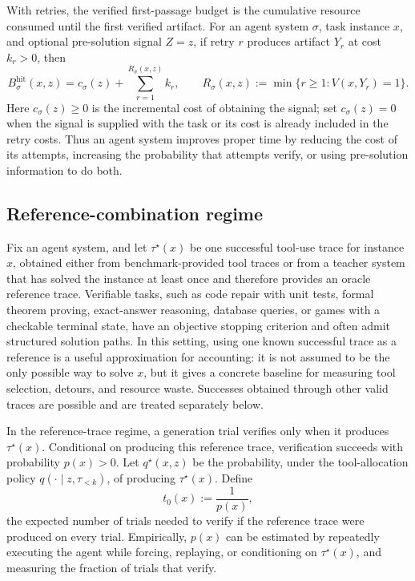 With retries, the verified first-passage budget is the cumulative resource
consumed until the first verified artifact.  For an agent system \(\sigma\), task
instance \(x\), and optional pre-solution signal \(Z=z\), if retry \(r\) produces
artifact \(Y_r\) at cost \(k_r>0\), then
\[
B_\sigma^{\mathrm{hit}}(x,z)
=
c_\sigma(z)+\sum_{r=1}^{R_\sigma(x,z)} k_r,
\qquad
R_\sigma(x,z):=\min\{r\ge1:V(x,Y_r)=1\}.
\]
Here \(c_\sigma(z)\ge0\) is the incremental cost of obtaining the signal; set
\(c_\sigma(z)=0\) when the signal is supplied with the task or its cost is
already included in the retry costs.  Thus an agent system improves proper time
by reducing the cost of its attempts, increasing the probability that attempts
verify, or using pre-solution information to do both.

\subsection{Reference-combination regime}

Fix an agent
system, and let \(\tau^\star(x)\) be one successful tool-use trace for instance
\(x\), obtained either from benchmark-provided tool traces or from a teacher
system that has solved the instance at least once and therefore provides an
oracle reference trace. Verifiable tasks, such as code repair with unit tests,
formal theorem proving, exact-answer reasoning, database queries, or games with
a checkable terminal state, have an objective stopping criterion and often admit
structured solution paths. In this setting, using one known successful trace as
a reference is a useful approximation for accounting: it is not assumed to be
the only possible way to solve \(x\), but it gives a concrete baseline for
measuring tool selection, detours, and resource waste. Successes obtained
through other valid traces are possible and are treated separately below.

In the reference-trace regime, a generation trial verifies only when it produces
\(\tau^\star(x)\). Conditional on producing this reference trace, verification
succeeds with probability \(p(x)>0\). Let \(q^\star(x,z)\) be the probability,
under the tool-allocation policy \(q(\cdot\mid z,\tau_{<k})\), of producing
\(\tau^\star(x)\). Define
\[
t_0(x):=\frac{1}{p(x)},
\]
the expected number of trials needed to verify if the reference trace were
produced on every trial. Empirically, \(p(x)\) can be estimated by repeatedly
executing the agent while forcing, replaying, or conditioning on
\(\tau^\star(x)\), and measuring the fraction of trials that verify.

